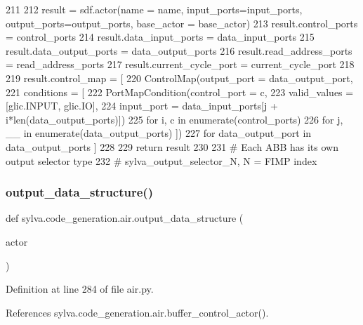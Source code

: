 \begin{DoxyCode}
211 
212   result = sdf.actor(name = name, input\_ports=input\_ports, output\_ports=output\_ports, base\_actor = 
      base\_actor)
213   result.control\_ports = control\_ports
214   result.data\_input\_ports = data\_input\_ports
215   result.data\_output\_ports = data\_output\_ports
216   result.read\_address\_ports = read\_address\_ports
217   result.current\_cycle\_port = current\_cycle\_port
218 
219   result.control\_map = [
220     ControlMap(output\_port = data\_output\_port,
221       conditions = [
222         PortMapCondition(control\_port = c,
223           valid\_values = [glic.INPUT, glic.IO],
224           input\_port = data\_input\_ports[j + i*len(data\_output\_ports)])
225         \textcolor{keywordflow}{for} i, c \textcolor{keywordflow}{in} enumerate(control\_ports)
226           \textcolor{keywordflow}{for} j, \_\_ \textcolor{keywordflow}{in} enumerate(data\_output\_ports) ])
227     \textcolor{keywordflow}{for} data\_output\_port \textcolor{keywordflow}{in} data\_output\_ports ]
228 
229   \textcolor{keywordflow}{return} result
230 
231 \textcolor{comment}{# Each ABB has its own output selector type}
232 \textcolor{comment}{# sylva\_output\_selector\_N, N = FIMP index}
\end{DoxyCode}
\mbox{\label{namespacesylva_1_1code__generation_1_1air_a83186b3b999778cee36ac81d42b2cd44}} 
\subsubsection{\texorpdfstring{output\+\_\+data\+\_\+structure()}{output\_data\_structure()}}
{\footnotesize\ttfamily def sylva.\+code\+\_\+generation.\+air.\+output\+\_\+data\+\_\+structure (\begin{DoxyParamCaption}\item[{}]{actor }\end{DoxyParamCaption})}



Definition at line 284 of file air.\+py.



References sylva.\+code\+\_\+generation.\+air.\+buffer\+\_\+control\+\_\+actor().



